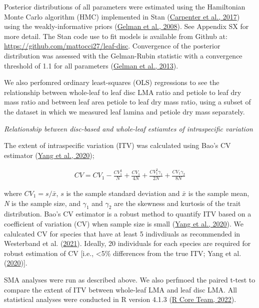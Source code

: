 \documentclass[
  12pt,
  a4paper,
,tablecaptionabove
]{scrartcl}
\begin{document}
Posterior distributions of all parameters were estimated using the Hamiltonian Monte Carlo algorithm (HMC) implemented in Stan (\protect\hyperlink{ref-Carpenter2017}{Carpenter et al., 2017}) using the weakly-informative priors (\protect\hyperlink{ref-Gelman2008}{Gelman et al., 2008}).
See Appendix SX for more detail.
The Stan code use to fit models is available from Github at: \url{https://github.com/mattocci27/leaf-disc}.
Convergence of the posterior distribution was assessed with the Gelman-Rubin statistic with a convergence threshold of 1.1 for all parameters (\protect\hyperlink{ref-Gelman2013}{Gelman et al., 2013}).

We also perfomred ordinary least-squares (OLS) regressions to see the relationship between whole-leaf to leaf disc LMA ratio and petiole to leaf dry mass ratio and between leaf area petiole to leaf dry mass ratio, using a subset of the dataset in which we measured leaf lamina and petiole dry mass separately.

\emph{Relationship between disc-based and whole-leaf estiamtes of intraspecific variation}

The extent of intraspecific variation (ITV) was calculated using Bao's CV estimator (\protect\hyperlink{ref-Yang2020}{Yang et al., 2020});

\begin{align}
CV = CV_1 - \frac{CV_1^3}{N} + \frac{CV_1}{4N} + \frac{CV_1^2 \gamma_1}{2N} + \frac{CV_1 \gamma_2}{8N} \label{eq:CV}
\end{align}

where \(CV_1 = s/\bar{x}\), \(s\) is the sample standard deviation and \(\bar{x}\) is the sample mean, \emph{N} is the sample size, and \(\gamma_1\) and \(\gamma_2\) are the skewness and kurtosis of the trait distribution.
Bao's CV estimator is a robust method to quantify ITV based on a coefficient of variation (CV) when sample size is small (\protect\hyperlink{ref-Yang2020}{Yang et al., 2020}).
We calulcated CV for species that have at least 5 indivdiuals as recommended in Westerband et al. (\protect\hyperlink{ref-Westerband2021}{2021}).
Ideally, 20 individuals for each species are required for robust estimation of CV {[}i.e., \textless5\% differences from the true ITV; Yang et al. (\protect\hyperlink{ref-Yang2020}{2020}){]}.

SMA analyses were run as described above.
We also perfmoed the paired t-test to compare the extent of ITV between whole-leaf LMA and leaf disc LMA.
All statistical analyses were conducted in R version 4.1.3 (\protect\hyperlink{ref-RCoreTeam2022}{R Core Team, 2022}).
\end{document}
